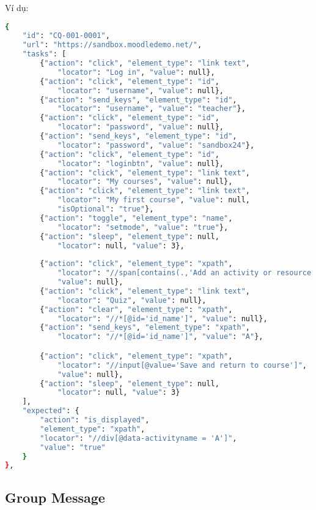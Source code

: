 Ví dụ:
\begin{lstlisting}[language=bash, caption={Ví dụ testcase CQ-001-0001 ở level 2}]
{
    "id": "CQ-001-0001",
    "url": "https://sandbox.moodledemo.net/",
    "tasks": [
        {"action": "click", "element_type": "link text", 
            "locator": "Log in", "value": null},
        {"action": "click", "element_type": "id", 
            "locator": "username", "value": null},
        {"action": "send_keys", "element_type": "id", 
            "locator": "username", "value": "teacher"},
        {"action": "click", "element_type": "id", 
            "locator": "password", "value": null},
        {"action": "send_keys", "element_type": "id", 
            "locator": "password", "value": "sandbox24"},
        {"action": "click", "element_type": "id", 
            "locator": "loginbtn", "value": null},
        {"action": "click", "element_type": "link text", 
            "locator": "My courses", "value": null},
        {"action": "click", "element_type": "link text", 
            "locator": "My first course", "value": null, 
            "isOptional": "true"},
        {"action": "toggle", "element_type": "name", 
            "locator": "setmode", "value": "true"}, 
        {"action": "sleep", "element_type": null, 
            "locator": null, "value": 3},  
        
        {"action": "click", "element_type": "xpath", 
            "locator": "//span[contains(.,'Add an activity or resource')]", 
            "value": null},
        {"action": "click", "element_type": "link text", 
            "locator": "Quiz", "value": null},
        {"action": "clear", "element_type": "xpath", 
            "locator": "//*[@id='id_name']", "value": null},
        {"action": "send_keys", "element_type": "xpath", 
            "locator": "//*[@id='id_name']", "value": "A"},

        {"action": "click", "element_type": "xpath", 
            "locator": "//input[@value='Save and return to course']", 
            "value": null},
        {"action": "sleep", "element_type": null, 
            "locator": null, "value": 3}
    ],
    "expected": {
        "action": "is_displayed",
        "element_type": "xpath",
        "locator": "//div[@data-activityname = 'A']",
        "value": "true"
    }
},
\end{lstlisting}
\subsection{Group Message}
